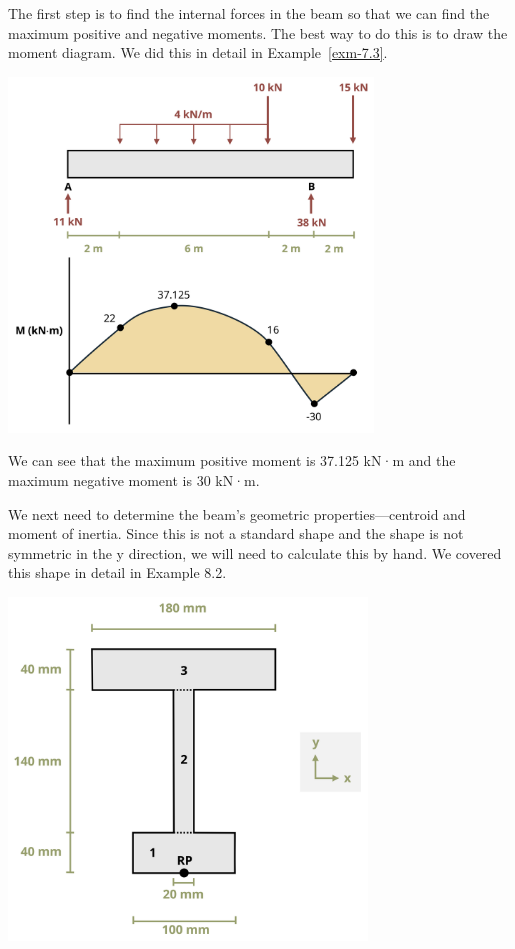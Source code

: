 \documentclass[
  letterpaper,
  DIV=11,
  numbers=noendperiod]{scrreprt}
\theoremstyle{definition}
\theoremstyle{remark}
\begin{document}
\begin{tcolorbox}
\begin{tcolorbox}
The first step is to find the internal forces in the beam so that we can
find the maximum positive and negative moments. The best way to do this
is to draw the moment diagram. We did this in detail in
Example~\ref{exm-7.3}.

\begin{center}
\includegraphics[width=3.8125in,height=\textheight]{images/clipboard-191172276.png}
\end{center}

We can see that the maximum positive moment is 37.125 kN·m and the
maximum negative moment is 30 kN·m.

We next need to determine the beam's geometric properties---centroid and
moment of inertia. Since this is not a standard shape and the shape is
not symmetric in the y direction, we will need to calculate this by
hand. We covered this shape in detail in Example 8.2.

\begin{center}
\includegraphics[width=3.75in,height=\textheight]{images/CH9 PNGs/Example 9.2 part 5.png}
\end{center}


\end{tcolorbox}
\end{tcolorbox}
\end{document}
